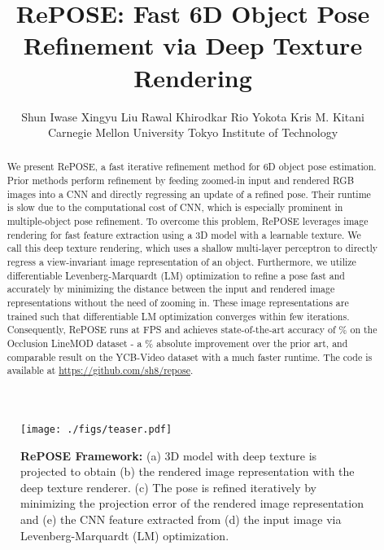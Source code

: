\documentclass[10pt,twocolumn,letterpaper]{article}
\begin{document}
\title{RePOSE: Fast 6D Object Pose Refinement via Deep Texture Rendering}

\author{
Shun Iwase \qquad 
Xingyu Liu \qquad 
Rawal Khirodkar \qquad
Rio Yokota \qquad
Kris M. Kitani
\\Carnegie Mellon University \qquad Tokyo Institute of Technology \\
}



\maketitle
\ificcvfinal\thispagestyle{empty}\fi

\begin{abstract}
  We present RePOSE, a fast iterative refinement method for 6D object pose estimation. Prior methods perform refinement by feeding zoomed-in input and rendered RGB images into a CNN and directly regressing an update of a refined pose. Their runtime is slow due to the computational cost of CNN, which is especially prominent in multiple-object pose refinement. To overcome this problem, RePOSE leverages image rendering for fast feature extraction using a 3D model with a learnable texture. We call this deep texture rendering, which uses a shallow multi-layer perceptron to directly regress a view-invariant image representation of an object. Furthermore, we utilize differentiable Levenberg-Marquardt (LM) optimization to refine a pose fast and accurately by minimizing the distance between the input and rendered image representations without the need of zooming in. These image representations are trained such that differentiable LM optimization converges within few iterations. 
Consequently, RePOSE runs at  FPS and achieves state-of-the-art accuracy of \% on the Occlusion LineMOD dataset - a \% absolute improvement over the prior art, and comparable result on the YCB-Video dataset with a much faster runtime. The code is available at \href{https://github.com/sh8/repose}{https://github.com/sh8/repose}.
\end{abstract}




\begin{figure}[t]
\hspace*{-0.2cm}
\centering
\texttt{[image: ./figs/teaser.pdf]}
\caption{\textbf{RePOSE Framework:} (a) 3D model with deep texture is projected to obtain (b) the rendered image representation with the deep texture renderer. (c) The pose is refined iteratively by minimizing the projection error of the rendered image representation and (e) the CNN feature extracted from (d) the input image via Levenberg-Marquardt (LM) optimization.
}
\label{fig:pipeline}
\end{figure}
\end{document}
